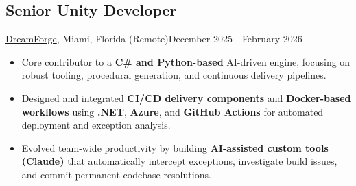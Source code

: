 \subsection{Senior Unity Developer}{\href{https://www.playdreamforge.com/}{DreamForge}, Miami, Florida (Remote)}{December 2025 - February 2026}
\begin{itemize}
    \item Core contributor to a \textbf{C\# and Python-based} AI-driven engine, focusing on robust tooling, procedural generation, and continuous delivery pipelines.
    \item Designed and integrated \textbf{CI/CD delivery components} and \textbf{Docker-based workflows} using \textbf{.NET}, \textbf{Azure}, and \textbf{GitHub Actions} for automated deployment and exception analysis.
    \item Evolved team-wide productivity by building \textbf{AI-assisted custom tools (Claude)} that automatically intercept exceptions, investigate build issues, and commit permanent codebase resolutions.
\end{itemize}